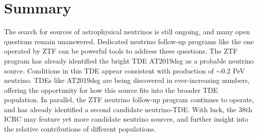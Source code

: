 \documentclass[a4paper,11pt]{article}
\begin{document}
\section{Summary}

The search for sources of astrophysical neutrinos is still ongoing, and many open questions remain unanswered. Dedicated neutrino follow-up programs like the one operated by ZTF can be powerful tools to address these questions. The ZTF program has already identified the bright TDE AT2019dsg as a probable neutrino source. Conditions in this TDE appear consistent with production of $\sim$0.2 PeV neutrino. TDEs like AT2019dsg are being discovered in ever-increasing numbers, offering the opportunity for how this source fits into the broader TDE population. In parallel, the ZTF neutrino follow-up program continues to operate, and has already identified a second candidate neutrino-TDE. With luck, the 38th ICRC may feature yet more candidate neutrino sources, and further insight into the relative contributions of different populations.





%
\end{document}
